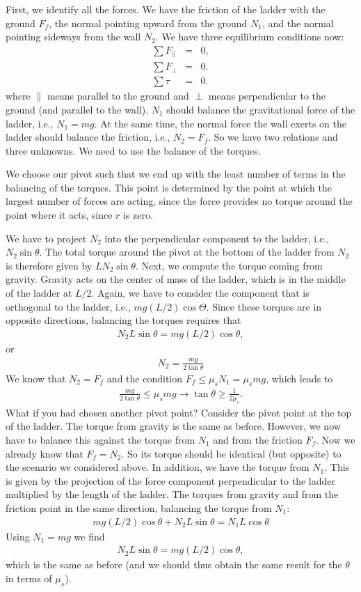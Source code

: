 \documentclass[12pt]{article}
\newcommand{\be}{\begin{eqnarray}}
\newcommand{\ee}{\end{eqnarray}}
\begin{document}
First, we identify all the forces. We have the friction of the ladder with the ground $F_f$, the normal pointing upward from the ground $N_1$, and the normal pointing sideways from the wall $N_2$. We have three equilibrium conditions now:
\be
\sum F_{\parallel} &=& 0, \\
\sum F_{\perp} &= &0. \\
\sum \tau  &=& 0.
\ee
where $\parallel$ means parallel to the ground and $\perp$ means perpendicular to the ground (and parallel to the wall). $N_1$ should balance the gravitational force of the ladder, i.e., $N_1 = mg$. At the same time, the normal force the wall exerts on the ladder should balance the friction, i.e., $N_2 =F_f$. So we have two relations and three unknowns. We need to use the balance of the torques.

We choose our pivot such that we end up with the least number of terms in the balancing of the torques. This point is determined by the point at which the largest number of forces are acting, since the force provides no torque around the point where it acts, since $r$ is zero. 

We have to project $N_2$ into the perpendicular component to the ladder, i.e., $N_2 \sin \theta$. The total torque around the pivot at the bottom of the ladder from $N_2$ is therefore given by $L N_2 \sin \theta$. Next, we compute the torque coming from gravity. Gravity acts on the center of mass of the ladder, which is in the middle of the ladder at $L/2$. Again, we have to consider the component that is orthogonal to the ladder, i.e., $m g (L/2) \cos \Theta $. Since these torques are in opposite directions, balancing the torques requires that
\be
N_2 L \sin \theta = m g (L/2) \cos \theta, 
\ee
or 
\be
N_2 = \frac{mg}{2 \tan \theta}
\ee
We know that $N_2 = F_f$ and the condition $F_f \leq \mu_s N_1 = \mu_s m g $, which leads to 
\be
\frac{mg}{2 \tan \theta} \leq \mu_s mg \rightarrow \tan \theta \geq \frac{1}{2\mu_s}.
\ee
What if you had chosen another pivot point? Consider the pivot point at the top of the ladder. The torque from gravity is the same as before. However, we now have to balance this against the torque from $N_1$ and from the friction $F_f$. Now we already know that $F_f = N_2$. So its torque should be identical (but opposite) to the scenario we considered above. In addition, we have the torque from $N_1$. This is given by the projection of the force component perpendicular to the ladder multiplied by the length of the ladder. The torques from gravity and from the friction point in the same direction, balancing the torque from $N_1$:
\be
m g (L/2) \cos \theta + N_2 L \sin \theta = N_1 L \cos \theta
\ee
Using $N_1 = mg$ we find 
\be
N_2 L \sin \theta = m g (L/2) \cos \theta,
\ee
which is the same as before (and we should thus obtain the same result for the $\theta$ in terms of $\mu_s$).
\end{document}
